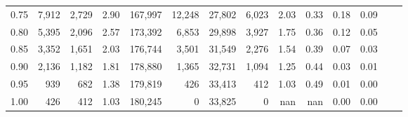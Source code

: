 \begin{tabular}{rrrrrrrrrrrrrr}
0.75 &   7,912 &  2,729 &    2.90 &  167,997 &   12,248 &  27,802 &   6,023 &  2.03 &  0.33 &  0.18 &      0.09 \\
0.80 &   5,395 &  2,096 &    2.57 &  173,392 &    6,853 &  29,898 &   3,927 &  1.75 &  0.36 &  0.12 &      0.05 \\
0.85 &   3,352 &  1,651 &    2.03 &  176,744 &    3,501 &  31,549 &   2,276 &  1.54 &  0.39 &  0.07 &      0.03 \\
0.90 &   2,136 &  1,182 &    1.81 &  178,880 &    1,365 &  32,731 &   1,094 &  1.25 &  0.44 &  0.03 &      0.01 \\
0.95 &     939 &    682 &    1.38 &  179,819 &      426 &  33,413 &     412 &  1.03 &  0.49 &  0.01 &      0.00 \\
1.00 &     426 &    412 &    1.03 &  180,245 &        0 &  33,825 &       0 &   nan &   nan &  0.00 &      0.00 \\
\bottomrule
\end{tabular}
